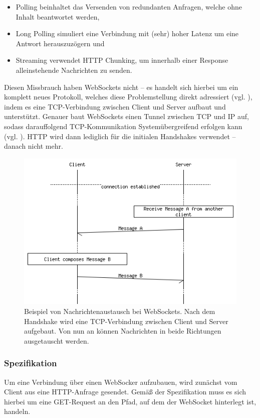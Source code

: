 \documentclass[sigplan, screen]{acmart}
\begin{document}
\begin{itemize}
  \item Polling beinhaltet das Versenden von redundanten Anfragen, welche ohne Inhalt beantwortet werden,
  \item Long Polling simuliert eine Verbindung mit (sehr) hoher Latenz um eine Antwort herauszuzögern und
  \item Streaming verwendet HTTP Chunking, um innerhalb einer Response alleinstehende Nachrichten zu senden.
\end{itemize}

Diesen Missbrauch haben WebSockets nicht -- es handelt sich hierbei um ein komplett neues Protokoll,
welches diese Problemstellung direkt adressiert (vgl. \cite[Abs. 1.1]{melnikov_websocket_2011}),
indem es eine TCP-Verbindung zwischen Client und Server aufbaut und unterstützt.
Genauer baut WebSockets einen Tunnel zwischen TCP und IP auf, sodass darauffolgend TCP-Kommunikation Systemübergreifend erfolgen kann (vgl. \cite[Abs. 1.5]{melnikov_websocket_2011}).
HTTP wird dann lediglich für die initialen Handshakes verwendet -- danach nicht mehr.


\begin{figure}[H]
  \centering
  \includegraphics[width=.45\textwidth]{assets/msc/websockets.png}
  \caption[Nachrichtenaustausch bei WebSockets]{Beispiel von Nachrichtenaustausch bei WebSockets.
    Nach dem Handshake wird eine TCP-Verbindung zwischen Client und Server aufgebaut.
    Von nun an können Nachrichten in beide Richtungen ausgetauscht werden.}
  \label{fig:websockets}
\end{figure}

\subsubsection{Spezifikation}
\label{sec:websocket-spec}
Um eine Verbindung über einen WebSocker aufzubauen, wird zunächst vom Client aus eine HTTP-Anfrage gesendet.
Gemäß der Spezifikation muss es sich hierbei um eine GET-Request an den Pfad, auf dem der WebSocket hinterlegt ist, handeln.
\end{document}
